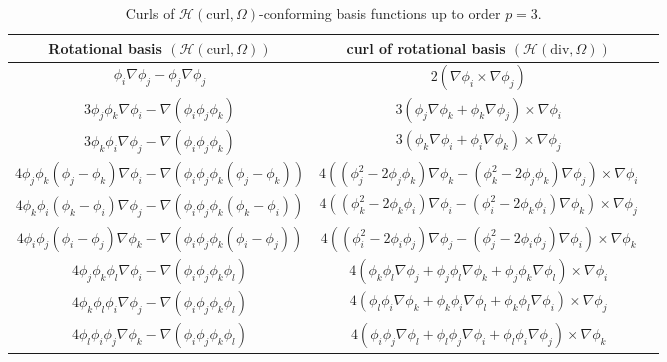 \begin{table}
\begin{center}
\begin{tabular}{|c|c|c|}
\hline 
Rotational basis $\left(\mathcal{H}(\mathrm{curl},\Omega)\right)$ & curl of rotational basis $\left(\mathcal{H}(\mathrm{div},\Omega)\right)$ \\
\hline
\hline 
$\phi_i\nabla\phi_j-\phi_j\nabla\phi_j$  & $2  (\nabla \phi_i \times \nabla \phi_j)$ \\
\hline 
$3\phi_j\phi_k\nabla\phi_i-\nabla(\phi_i\phi_j\phi_k)$ & $3 (\phi_j \nabla \phi_k +  \phi_k \nabla \phi_j ) \times \nabla \phi_i$ \\
$3\phi_k\phi_i\nabla\phi_j-\nabla(\phi_i\phi_j\phi_k)$ & $3 (\phi_k \nabla \phi_i + \phi_i \nabla \phi_k ) \times \nabla \phi_j$ \\
\hline 
$4\phi_j\phi_k(\phi_j - \phi_k)\nabla\phi_i - \nabla\left(\phi_i\phi_j\phi_k(\phi_j-\phi_k)\right)$ & $4\left((\phi_j^2-2\phi_j\phi_k)\nabla\phi_k - (\phi_k^2-2\phi_j\phi_k)\nabla\phi_j \right) \times\nabla\phi_i$ \\
$4\phi_k\phi_i(\phi_k - \phi_i)\nabla\phi_j - \nabla\left(\phi_i\phi_j\phi_k(\phi_k-\phi_i)\right)$ & $4\left( (\phi_k^2-2\phi_k\phi_i)\nabla\phi_i - (\phi_i^2-2\phi_k\phi_i) \nabla\phi_k \right) \times\nabla\phi_j$ \\
$4\phi_i\phi_j(\phi_i - \phi_j)\nabla\phi_k - \nabla\left(\phi_i\phi_j\phi_k(\phi_i-\phi_j)\right)$ & $4\left((\phi_i^2-2\phi_i\phi_j)\nabla\phi_j - (\phi_j^2-2\phi_i\phi_j) \nabla\phi_i\right) \times\nabla\phi_k$ \\
$4\phi_j\phi_k\phi_l\nabla\phi_i - \nabla(\phi_i\phi_j\phi_k\phi_l)$ & $4\left(\phi_k\phi_l\nabla\phi_j + \phi_j\phi_l\nabla\phi_k + \phi_j\phi_k\nabla\phi_l\right)\times\nabla\phi_i$ \\ 
$4\phi_k\phi_l\phi_i\nabla\phi_j - \nabla(\phi_i\phi_j\phi_k\phi_l)$ & $4\left(\phi_l\phi_i\nabla\phi_k + \phi_k\phi_i\nabla\phi_l + \phi_k\phi_l\nabla\phi_i\right)\times\nabla\phi_j$ \\ 
$4\phi_l\phi_i\phi_j\nabla\phi_k - \nabla(\phi_i\phi_j\phi_k\phi_l)$ & $4\left(\phi_i\phi_j\nabla\phi_l+ \phi_l\phi_j\nabla\phi_i + \phi_l\phi_i\nabla\phi_j\right)\times\nabla\phi_k$ \\ 
\hline 
\end{tabular} 
\end{center}
\caption{Curls of $\mathcal{H}(\mathrm{curl},\Omega)$-conforming basis functions up to order $p = 3$.}
\label{tab:curlHcurlfunctions}
\end{table}

